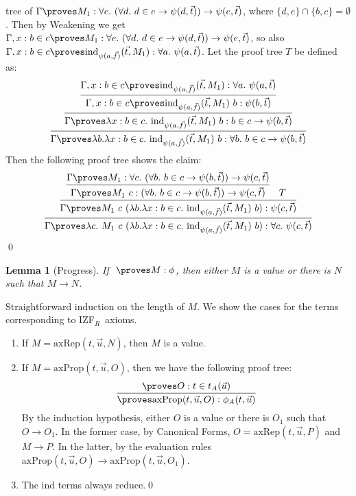 \documentclass{LMCS}
\newtheorem{lemma}[thm]{Lemma}
\newcommand{\p}{\proves}
\newcommand{\g}{\Gamma}
\newcommand{\gp}{\Gamma \proves}
\newcommand{\pl}[1]{\ensuremath{\mathrm{#1}}}
\newcommand{\IND}{\pl{ind}}
\newcommand{\izfr}{IZF${}_R$}
\begin{document}
\begin{enumerate}[$\bullet$]
tree of $\gp M_1 : \forall e.\ (\forall d.\ d \in e \to \psi(d, \vec{t}))
\to \psi(e, \vec{t})$, where $\{ d, e \} \cap \{ b, c \} = \emptyset$. Then
by Weakening we get $\g, x : b \in c \p M_1 : \forall e.\ (\forall d.\ d
\in e \to \psi(d, \vec{t})) \to \psi(e, \vec{t})$, so also $\g, x : b \in c \p
\IND_{\psi(a, \vec{f})}(\vec{t}, M_1)
: \forall a.\ \psi(a, \vec{t})$. Let the proof tree $T$ be defined as:
\[
\infer{\gp \lambda b. \lambda x : b \in c.\ \IND_{\psi(a,
\vec{f})}(\vec{t}, M_1)\ b : \forall b.\ b \in c \to \psi(b,
\vec{t})}
    {
      \infer{\gp \lambda x : b \in c.\ \IND_{\psi(a,
\vec{f})}(\vec{t}, M_1)\ b : b \in c \to \psi(b,
\vec{t})}
      {
        \infer{\g, x : b \in c \p \IND_{\psi(a, \vec{f})}(
\vec{t}, M_1)\ b : \psi(b, \vec{t})}
        {
	  \g, x : b \in c \p \IND_{\psi(a, \vec{f})}(\vec{t}, M_1)
: \forall a.\ \psi(a, \vec{t})
	}
      }
    }
\]
Then the following proof tree shows the claim:
\[
\infer{\gp \lambda c.\ M_1\ c\ (\lambda b. \lambda x : b \in c.\ \IND_{\psi(a,
\vec{f})}(\vec{t}, M_1)\ b) : \forall c.\ \psi(c, \vec{t})}
{
  \infer
  {
    \gp M_1\ c\ (\lambda b. \lambda x : b \in c.\ \IND_{\psi(a,
\vec{f})}(\vec{t}, M_1)\ b) : \psi(c, \vec{t})
  }
  {
    \infer{\gp M_1\ c : (\forall b.\ b \in c \to \psi(b, \vec{t})) \to \psi(c, \vec{t})}
    {
      \gp M_1 : \forall c.\ (\forall b.\ b \in c \to \psi(b, \vec{t})) \to
\psi(c, \vec{t})
    }
    &
    T
  }
}
\]\qed
\end{enumerate}

\begin{lemma}[Progress]
If $\ \proves M : \phi$, then either $M$ is a value or there is $N$ such that $M \to N$.
\end{lemma}
\proof Straightforward induction on the length of $M$. We show the cases for the
terms corresponding to \izfr\ axioms.
\begin{enumerate}[$\bullet$]
\item If $M = \pl{axRep}(t, \vec{u}, N)$, then $M$ is a value.
\item If $M = \pl{axProp}(t, \vec{u}, O)$, then we have the following proof tree:
\[
\infer{\p \pl{axProp}(t, \vec{u}, O) : \phi_A(t, \vec{u})}
{
\p O : t \in t_A(\vec{u})
}
\]
By the induction hypothesis, either $O$ is a value or there is $O_1$ such
that $O \to O_1$. In the former case, by Canonical Forms, $O = \pl{axRep}(t,
\vec{u}, P)$ and $M \to P$. In the latter, by the evaluation rules $\pl{axProp}(t,
\vec{u}, O) \to \pl{axProp}(t, \vec{u}, O_1)$.
\item The $\pl{ind}$ terms always reduce.\qed
\end{enumerate}
\end{document}
